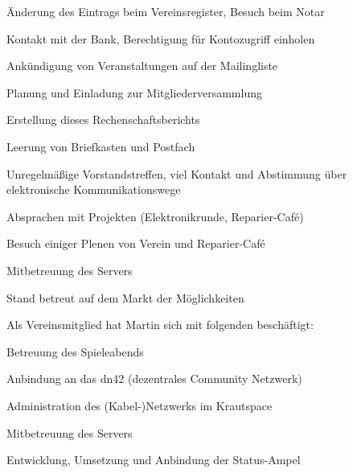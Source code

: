 \documentclass[ngerman]{scrartcl}
\begin{document}
\begin{compactitem}
\begin{compactitem}
	\end{compactitem}
	\item Änderung des Eintrags beim Vereinsregister, Besuch beim Notar
	\item Kontakt mit der Bank, Berechtigung für Kontozugriff einholen
	\item Ankündigung von Veranstaltungen auf der Mailingliste
	\item Planung und Einladung zur Mitgliederversammlung
	\item Erstellung dieses Rechenschaftsberichts
	\item Leerung von Briefkasten und Postfach
	\item Unregelmäßige Vorstandstreffen, viel Kontakt und Abstimmung über elektronische Kommunikationswege
	\item Absprachen mit Projekten (Elektronikrunde, Reparier-Café)
	\item Besuch einiger Plenen von Verein und Reparier-Café
	\item Mitbetreuung des Servers
	\item Stand betreut auf dem Markt der Möglichkeiten
\end{compactitem}

Als Vereinsmitglied hat Martin sich mit folgenden beschäftigt: 
\begin{compactitem}
	\item Betreuung des Spieleabends
	\item Anbindung an das dn42 (dezentrales Community Netzwerk)
	\item Administration des (Kabel-)Netzwerks im Krautspace
	\item Mitbetreuung des Servers
	\item Entwicklung, Umsetzung und Anbindung der Status-Ampel
\end{compactitem}
\end{document}
